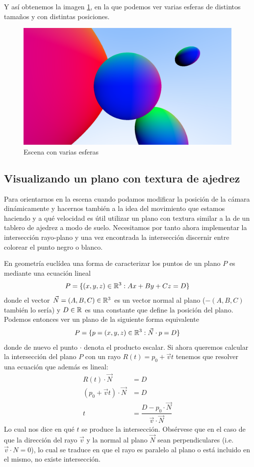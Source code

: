 Y así obtenemos la imagen \ref{fig:varias-esferas}, en la que podemos ver varias esferas de distintos tamaños y con distintas posiciones.

\begin{figure} [ht]
    \centering
    \includegraphics[scale = 0.25]{img/C7/varias-esferas.png}
    \caption{Escena con varias esferas}
    \label{fig:varias-esferas}
\end{figure}

\subsection{Visualizando un plano con textura de ajedrez}
\label{subsection:plano}

Para orientarnos en la escena cuando podamos modificar la posición de la cámara dinámicamente y hacernos también a la idea del movimiento que estamos haciendo y a qué velocidad es útil utilizar un plano con textura similar a la de un tablero de ajedrez a modo de suelo. Necesitamos por tanto ahora implementar la intersección rayo-plano y una vez encontrada la intersección discernir entre colorear el punto negro o blanco.

En geometría euclídea una forma de caracterizar los puntos de un plano $P$ es mediante una ecuación lineal
$$
P = \{(x,y,z)\in\mathbb{R}^3:Ax+By+Cz=D\}
$$
donde el vector $\vec N=(A,B,C)\in\mathbb{R}^3$ es un vector normal al plano ($-(A,B,C)$ también lo sería) y $D\in\mathbb{R}$ es una constante que define la posición del plano. Podemos entonces ver un plano de la siguiente forma equivalente
$$
P = \{p=(x,y,z)\in\mathbb{R}^3:\vec N\cdot p = D\}
$$
donde de nuevo el punto $\cdot$ denota el producto escalar. Si ahora queremos calcular la intersección del plano $P$ con un rayo $R(t)=p_0+\vec vt$ tenemos que resolver una ecuación que además es lineal:
\begin{equation}
    \label{eq:plano-recta}
    \begin{split}
        R(t)\cdot \vec N &= D \\
        (p_0+\vec vt)\cdot \vec N & = D\\
        t &=\dfrac{D-p_0\cdot \vec N}{\vec v\cdot \vec N}
    \end{split}
\end{equation}
Lo cual nos dice en qué $t$ se produce la intersección. Obsérvese que en el caso de que la dirección del rayo $\vec v$ y la normal al plano $\vec N$ sean perpendiculares (i.e. $\vec v\cdot N=0$), lo cual se traduce en que el rayo es paralelo al plano o está incluido en el mismo, no existe intersección.

